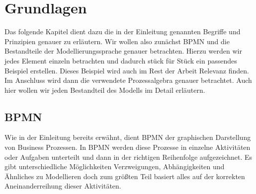 
\chapter{Grundlagen} %

\label{Chapter2} %







Das folgende Kapitel dient dazu die in der Einleitung genannten Begriffe und Prinzipien genauer zu erläutern. Wir wollen also zunächst BPMN und die Bestandteile der Modellierungssprache genauer betrachten. Hierzu werden wir jedes Element einzeln betrachten und dadurch stück für Stück ein passendes Beispiel erstellen. Dieses Beispiel wird auch im Rest der Arbeit Relevanz finden. 
Im Anschluss wird dann die verwendete Prozessalgebra genauer betrachtet. Auch hier wollen wir jeden Bestandteil des Modells im Detail erläutern.
\section{BPMN}
Wie in der Einleitung bereits erwähnt, dient BPMN der graphischen Darstellung von Business Prozessen. In BPMN werden diese Prozesse in einzelne Aktivitäten oder Aufgaben unterteilt und dann in der richtigen Reihenfolge aufgezeichnet. Es gibt unterschiedliche Möglichkeiten Verzweigungen, Abhängigkeiten und Ähnliches zu Modellieren doch zum größten Teil basiert alles auf der korrekten Aneinanderreihung dieser Aktivitäten.
